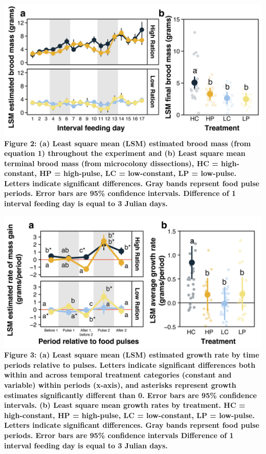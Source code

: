 \documentclass[11pt,]{article}
\begin{document}
\includegraphics[width=1\textwidth,height=\textheight]{./ms_figs/fig2_mcmass_v2.png}
\textbf{Figure 2: (a) Least square mean (LSM) estimated brood mass (from
equation 1) throughout the experiment and (b) Least square mean terminal
brood mass (from microcolony dissections), HC = high-constant, HP =
high-pulse, LC = low-constant, LP = low-pulse. Letters indicate
significant differences. Gray bands reprsent food pulse periods. Error
bars are 95\% confidence intervals. Difference of 1 interval feeding day
is equal to 3 Julian days.} \clearpage

\newpage

\includegraphics[width=1\textwidth,height=\textheight]{./ms_figs/fig3_growthrate_v2.png}
\textbf{Figure 3: (a) Least square mean (LSM) estimated growth rate by
time periods relative to pulses. Letters indicate significant
differences both within and across temporal treatment categories
(constant and variable) within periods (x-axis), and asterisks represent
growth estimates significantly different than 0. Error bars are 95\%
confidence intervals. (b) Least square mean growth rates by treatment.
HC = high-constant, HP = high-pulse, LC = low-constant, LP = low-pulse.
Letters indicate significant differences. Gray bands reprsent food pulse
periods. Error bars are 95\% confidence intervals Difference of 1
interval feeding day is equal to 3 Julian days.} \clearpage
\end{document}

